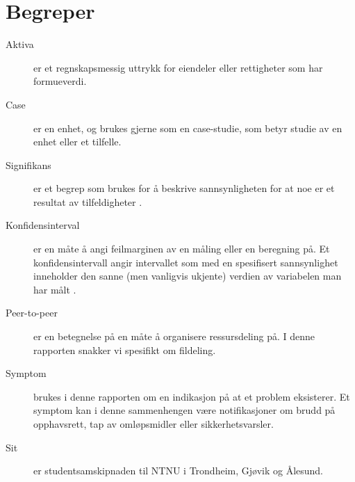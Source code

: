 \section*{Begreper}
\begin{description}
    \item[Aktiva] er et regnskapsmessig uttrykk for eiendeler eller rettigheter som har formueverdi.
    \item[Case] er en enhet, og brukes gjerne som en case-studie, som betyr studie av en enhet eller et tilfelle.
    \item[Signifikans] er et begrep som brukes for å beskrive sannsynligheten for at noe er et resultat av tilfeldigheter \cite{wiki:sig}.
    \item[Konfidensinterval] er en måte å angi feilmarginen av en måling eller en beregning på. Et konfidensintervall angir intervallet som med en spesifisert sannsynlighet inneholder den sanne (men vanligvis ukjente) verdien av variabelen man har målt \cite{wiki:konfidens}.
    \item[Peer-to-peer] er en betegnelse på en måte å organisere ressursdeling på. I denne rapporten snakker vi spesifikt om fildeling. 
    \item[Symptom] brukes i denne rapporten om en indikasjon på at et problem eksisterer. Et symptom kan i denne sammenhengen være notifikasjoner om brudd på opphavsrett, tap av omløpsmidler eller sikkerhetsvarsler. 
    \item[Sit] er studentsamskipnaden til NTNU i Trondheim, Gjøvik og Ålesund. 
\end{description}